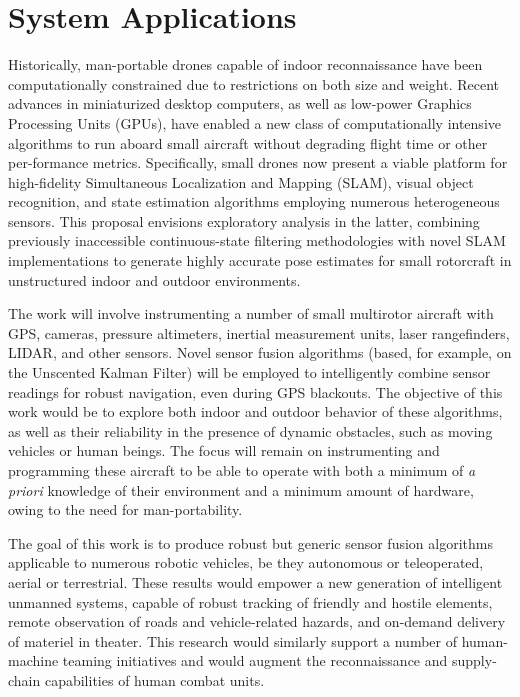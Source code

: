 \section{System Applications}

Historically, man-portable drones capable of indoor reconnaissance have been computationally constrained due to restrictions on both size and weight. Recent advances in miniaturized desktop computers, as well as low-power Graphics Processing Units (GPUs), have enabled a new class of computationally intensive algorithms to run aboard small aircraft without degrading flight time or other per-formance metrics. Specifically, small drones now present a viable platform for high-fidelity Simultaneous Localization and Mapping (SLAM), visual object recognition, and state estimation algorithms employing numerous heterogeneous sensors. This proposal envisions exploratory analysis in the latter, combining previously inaccessible continuous-state filtering methodologies with novel SLAM implementations to generate highly accurate pose estimates for small rotorcraft in unstructured indoor and outdoor environments.

The work will involve instrumenting a number of small multirotor aircraft with GPS, cameras, pressure altimeters, inertial measurement units, laser rangefinders, LIDAR, and other sensors. Novel sensor fusion algorithms (based, for example, on the Unscented Kalman Filter) will be employed to intelligently combine sensor readings for robust navigation, even during GPS blackouts. The objective of this work would be to explore both indoor and outdoor behavior of these algorithms, as well as their reliability in the presence of dynamic obstacles, such as moving vehicles or human beings. The focus will remain on instrumenting and programming these aircraft to be able to operate with both a minimum of \textit{a priori} knowledge of their environment and a minimum amount of hardware, owing to the need for man-portability.

The goal of this work is to produce robust but generic sensor fusion algorithms applicable to numerous robotic vehicles, be they autonomous or teleoperated, aerial or terrestrial. These results would empower a new generation of intelligent unmanned systems, capable of robust tracking of friendly and hostile elements, remote observation of roads and vehicle-related hazards, and on-demand delivery of materiel in theater. This research would similarly support a number of human-machine teaming initiatives and would augment the reconnaissance and supply-chain capabilities of human combat units.

